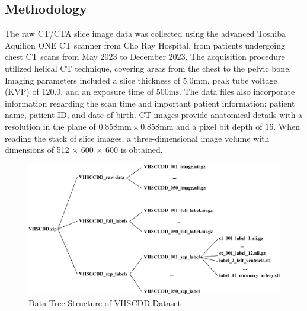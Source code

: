 \documentclass{article}
\begin{document}
\subsection{Methodology}
The raw CT/CTA slice image data was collected using the advanced Toshiba Aquilion ONE CT scanner from Cho Ray Hospital, from patients undergoing chest CT scans from May 2023 to December 2023. The acquisition procedure utilized helical CT technique, covering areas from the chest to the pelvic bone. Imaging parameters included a slice thickness of $5.0 \text{mm}$, peak tube voltage (KVP) of $120.0$, and an exposure time of $500 \text{ms}$. The data files also incorporate information regarding the scan time and important patient information: patient name, patient ID, and date of birth. CT images provide anatomical details with a resolution in the plane of $0.858 \text{mm} \times  0.858 \text{mm}$ and a pixel bit depth of $16$. When reading the stack of slice images, a three-dimensional image volume with dimensions of 512 × 600 × 600 is obtained. \\

\begin{figure}
    \centering
    \includegraphics[width=1\textwidth]{figures/Folders.png}
    \caption{Data Tree Structure of VHSCDD Dataset}
    \label{fig:3}
\end{figure}
\end{document}
